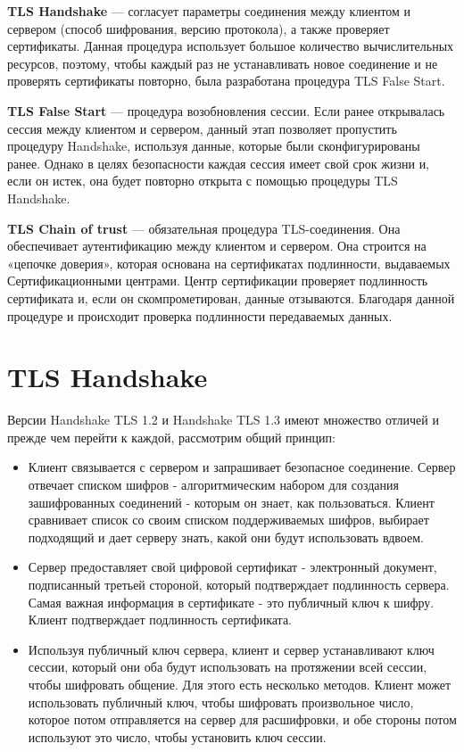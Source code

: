 \textbf{TLS Handshake} — согласует параметры соединения между клиентом и сервером (способ шифрования, версию протокола), а также проверяет сертификаты. Данная процедура использует большое количество вычислительных ресурсов, поэтому, чтобы каждый раз не устанавливать новое соединение и не проверять сертификаты повторно, была разработана процедура TLS False Start.

\textbf{TLS False Start} — процедура возобновления сессии. Если ранее открывалась сессия между клиентом и сервером, данный этап позволяет пропустить процедуру Handshake, используя данные, которые были сконфигурированы ранее. Однако в целях безопасности каждая сессия имеет свой срок жизни и, если он истек, она будет повторно открыта с помощью процедуры TLS Handshake.

\textbf{TLS Chain of trust} — обязательная процедура TLS-соединения. Она обеспечивает аутентификацию между клиентом и сервером. Она строится на «цепочке доверия», которая основана на сертификатах подлинности, выдаваемых Сертификационными центрами. Центр сертификации проверяет подлинность сертификата и, если он скомпрометирован, данные отзываются. Благодаря данной процедуре и происходит проверка подлинности передаваемых данных.


\section{TLS Handshake}

Версии Handshake TLS 1.2 и Handshake TLS 1.3 имеют множество отличей и прежде чем перейти к каждой, рассмотрим общий принцип:

\begin{itemize}
	\item Клиент связывается с сервером и запрашивает безопасное соединение. Сервер отвечает списком шифров - алгоритмическим набором для создания зашифрованных соединений - которым он знает, как пользоваться. Клиент сравнивает список со своим списком поддерживаемых шифров, выбирает подходящий и дает серверу знать, какой они будут использовать вдвоем.
	\item Сервер предоставляет свой цифровой сертификат - электронный документ, подписанный третьей стороной, который подтверждает подлинность сервера. Самая важная информация в сертификате - это публичный ключ к шифру. Клиент подтверждает подлинность сертификата.
	\item Используя публичный ключ сервера, клиент и сервер устанавливают ключ сессии, который они оба будут использовать на протяжении всей сессии, чтобы шифровать общение. Для этого есть несколько методов. Клиент может использовать публичный ключ, чтобы шифровать произвольное число, которое потом отправляется на сервер для расшифровки, и обе стороны потом используют это число, чтобы установить ключ сессии.
	
\end{itemize}



